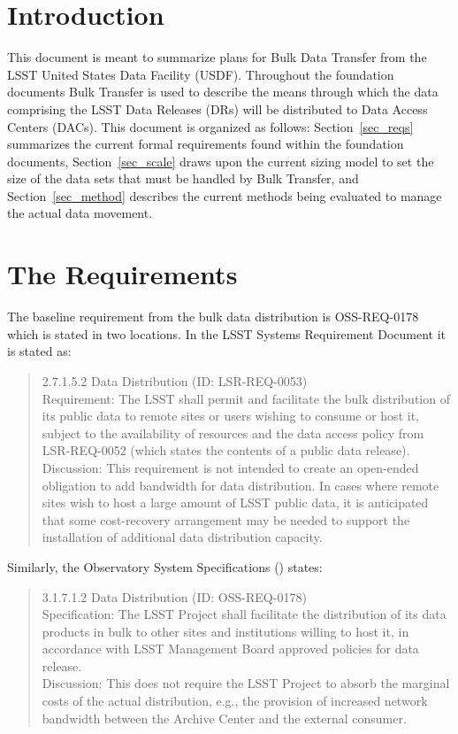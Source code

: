 \section{Introduction}

This document is meant to summarize plans for Bulk Data Transfer from the LSST United States Data 
Facility (USDF).  Throughout the foundation documents Bulk Transfer is used to describe the means 
through which the data comprising the LSST Data Releases (DRs) will be distributed to Data Access 
Centers (DACs).  This document is organized as follows: Section~\ref{sec_reqs} summarizes the 
current formal requirements found within the foundation documents, Section~\ref{sec_scale}
draws upon the current sizing model to set the size of the data sets that must be handled by 
Bulk Transfer, and Section~\ref{sec_method} describes the current methods being evaluated to manage 
the actual data movement.

\section{The Requirements\label{sec_reqs}}

The baseline requirement from the bulk data distribution is OSS-REQ-0178 which is stated in two locations.  
In the LSST Systems Requirement Document  it is stated as:

\begin{quote}
2.7.1.5.2 Data Distribution (ID: LSR-REQ-0053)\\
Requirement: The LSST shall permit and facilitate the bulk distribution of its public data to 
remote sites or users wishing to consume or host it, subject to the availability of resources 
and the data access policy from LSR-REQ-0052 (which states the contents of a public data release).\\
Discussion: This requirement is not intended to create an open-ended obligation to add bandwidth 
for data distribution. In cases where remote sites wish to host a large amount of LSST public data, 
it is anticipated that some cost-recovery arrangement may be needed to support the installation of 
additional data distribution capacity.\\
\end{quote}

Similarly, the Observatory System Specifications () states:
\begin{quote}
3.1.7.1.2 Data Distribution (ID: OSS-REQ-0178)\\
Specification: The LSST Project shall facilitate the distribution of its data products in bulk to 
other sites and institutions willing to host it, in accordance with LSST Management Board approved
policies for data release.\\
Discussion: This does not require the LSST Project to absorb the marginal costs of the actual 
distribution, e.g., the provision of increased network bandwidth between the Archive Center and 
the external consumer.\\
\end{quote}

